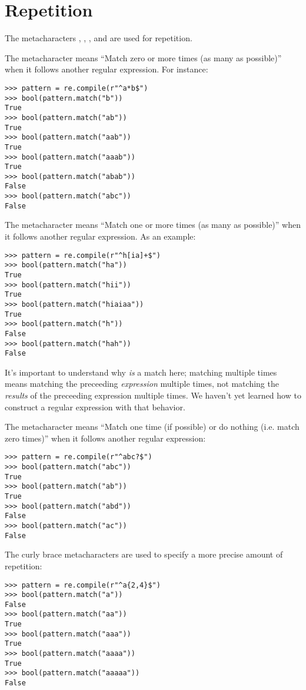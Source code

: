\section*{Repetition}
The metacharacters , , , and  are used for repetition.

The  metacharacter means ``Match zero or more times (as many as possible)'' when it follows another regular expression.
For instance:
\begin{lstlisting}
>>> pattern = re.compile(r"^a*b$")
>>> bool(pattern.match("b"))
True
>>> bool(pattern.match("ab"))
True
>>> bool(pattern.match("aab"))
True
>>> bool(pattern.match("aaab"))
True
>>> bool(pattern.match("abab"))
False
>>> bool(pattern.match("abc"))
False
\end{lstlisting}

The  metacharacter means ``Match one or more times (as many as possible)'' when it follows another regular expression.
As an example:
\begin{lstlisting}
>>> pattern = re.compile(r"^h[ia]+$")
>>> bool(pattern.match("ha"))
True
>>> bool(pattern.match("hii"))
True
>>> bool(pattern.match("hiaiaa"))
True
>>> bool(pattern.match("h"))
False
>>> bool(pattern.match("hah"))
False
\end{lstlisting}

It's important to understand why  \emph{is} a match here; matching multiple times means matching the preceeding \emph{expression} multiple times, not matching the \emph{results} of the preceeding expression multiple times. We haven't yet learned how to construct a regular expression with that behavior.

The  metacharacter means ``Match one time (if possible) or do nothing (i.e. match zero times)'' when it follows another regular expression:
\begin{lstlisting}
>>> pattern = re.compile(r"^abc?$")
>>> bool(pattern.match("abc"))
True
>>> bool(pattern.match("ab"))
True
>>> bool(pattern.match("abd"))
False
>>> bool(pattern.match("ac"))
False
\end{lstlisting}

The curly brace metacharacters are used to specify a more precise amount of repetition:
\begin{lstlisting}
>>> pattern = re.compile(r"^a{2,4}$")
>>> bool(pattern.match("a"))
False
>>> bool(pattern.match("aa"))
True
>>> bool(pattern.match("aaa"))
True
>>> bool(pattern.match("aaaa"))
True
>>> bool(pattern.match("aaaaa"))
False
\end{lstlisting}

